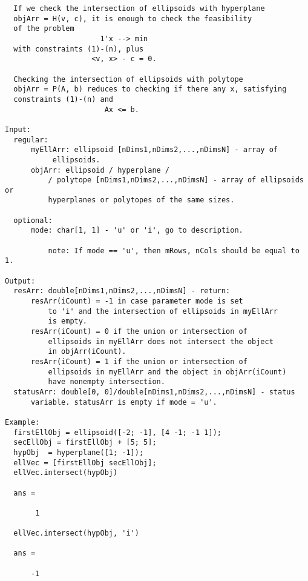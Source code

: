 \begin{verbatim}
  If we check the intersection of ellipsoids with hyperplane
  objArr = H(v, c), it is enough to check the feasibility
  of the problem
                      1'x --> min
  with constraints (1)-(n), plus
                    <v, x> - c = 0.

  Checking the intersection of ellipsoids with polytope
  objArr = P(A, b) reduces to checking if there any x, satisfying
  constraints (1)-(n) and
                       Ax <= b.

Input:
  regular:
      myEllArr: ellipsoid [nDims1,nDims2,...,nDimsN] - array of
           ellipsoids.
      objArr: ellipsoid / hyperplane /
          / polytope [nDims1,nDims2,...,nDimsN] - array of ellipsoids or
          hyperplanes or polytopes of the same sizes.

  optional:
      mode: char[1, 1] - 'u' or 'i', go to description.

          note: If mode == 'u', then mRows, nCols should be equal to 1.

Output:
  resArr: double[nDims1,nDims2,...,nDimsN] - return:
      resArr(iCount) = -1 in case parameter mode is set
          to 'i' and the intersection of ellipsoids in myEllArr
          is empty.
      resArr(iCount) = 0 if the union or intersection of
          ellipsoids in myEllArr does not intersect the object
          in objArr(iCount).
      resArr(iCount) = 1 if the union or intersection of
          ellipsoids in myEllArr and the object in objArr(iCount)
          have nonempty intersection.
  statusArr: double[0, 0]/double[nDims1,nDims2,...,nDimsN] - status
      variable. statusArr is empty if mode = 'u'.

Example:
  firstEllObj = ellipsoid([-2; -1], [4 -1; -1 1]);
  secEllObj = firstEllObj + [5; 5];
  hypObj  = hyperplane([1; -1]);
  ellVec = [firstEllObj secEllObj];
  ellVec.intersect(hypObj)

  ans =

       1

  ellVec.intersect(hypObj, 'i')

  ans =

      -1
\end{verbatim}
